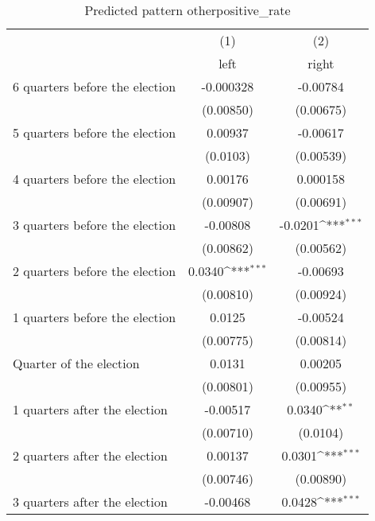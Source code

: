 \begin{table}[htbp]\centering
\def\sym#1{\ifmmode^{#1}\else\(^{#1}\)\fi}
\caption{Predicted pattern otherpositive\_rate}
\begin{tabular}{l*{2}{c}}
\hline\hline
                    &\multicolumn{1}{c}{(1)}&\multicolumn{1}{c}{(2)}\\
                    &\multicolumn{1}{c}{left}&\multicolumn{1}{c}{right}\\
\hline
 6 quarters before the election&   -0.000328         &    -0.00784         \\
                    &   (0.00850)         &   (0.00675)         \\
[1em]
 5 quarters before the election&     0.00937         &    -0.00617         \\
                    &    (0.0103)         &   (0.00539)         \\
[1em]
 4 quarters before the election&     0.00176         &    0.000158         \\
                    &   (0.00907)         &   (0.00691)         \\
[1em]
 3 quarters before the election&    -0.00808         &     -0.0201\sym{***}\\
                    &   (0.00862)         &   (0.00562)         \\
[1em]
 2 quarters before the election&      0.0340\sym{***}&    -0.00693         \\
                    &   (0.00810)         &   (0.00924)         \\
[1em]
 1 quarters before the election&      0.0125         &    -0.00524         \\
                    &   (0.00775)         &   (0.00814)         \\
[1em]
Quarter of the election&      0.0131         &     0.00205         \\
                    &   (0.00801)         &   (0.00955)         \\
[1em]
 1 quarters after the election&    -0.00517         &      0.0340\sym{**} \\
                    &   (0.00710)         &    (0.0104)         \\
[1em]
 2 quarters after the election&     0.00137         &      0.0301\sym{***}\\
                    &   (0.00746)         &   (0.00890)         \\
[1em]
 3 quarters after the election&    -0.00468         &      0.0428\sym{***}\\

\end{tabular}
\end{table}
